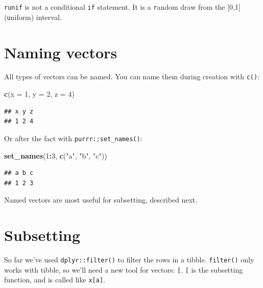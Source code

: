\documentclass[
]{book}
\newenvironment{Shaded}{\begin{snugshade}}{\end{snugshade}}
\newcommand{\DataTypeTok}[1]{\textcolor[rgb]{0.13,0.29,0.53}{#1}}
\newcommand{\DecValTok}[1]{\textcolor[rgb]{0.00,0.00,0.81}{#1}}
\newcommand{\KeywordTok}[1]{\textcolor[rgb]{0.13,0.29,0.53}{\textbf{#1}}}
\newcommand{\NormalTok}[1]{#1}
\newcommand{\OperatorTok}[1]{\textcolor[rgb]{0.81,0.36,0.00}{\textbf{#1}}}
\newcommand{\StringTok}[1]{\textcolor[rgb]{0.31,0.60,0.02}{#1}}
\begin{document}
\texttt{runif} is not a conditional \texttt{if} statement. It is a \texttt{r}andom draw from the {[}0,1{]} (\texttt{u}niform) interval.

\hypertarget{naming-vectors}{%
\section{Naming vectors}\label{naming-vectors}}

All types of vectors can be named.
You can name them during creation with \texttt{c()}:

\begin{Shaded}
\begin{Highlighting}[]
\KeywordTok{c}\NormalTok{(}\DataTypeTok{x =} \DecValTok{1}\NormalTok{, }\DataTypeTok{y =} \DecValTok{2}\NormalTok{, }\DataTypeTok{z =} \DecValTok{4}\NormalTok{)}
\end{Highlighting}
\end{Shaded}

\begin{verbatim}
## x y z 
## 1 2 4
\end{verbatim}

Or after the fact with \texttt{purrr::set\_names()}:

\begin{Shaded}
\begin{Highlighting}[]
\KeywordTok{set_names}\NormalTok{(}\DecValTok{1}\OperatorTok{:}\DecValTok{3}\NormalTok{, }\KeywordTok{c}\NormalTok{(}\StringTok{"a"}\NormalTok{, }\StringTok{"b"}\NormalTok{, }\StringTok{"c"}\NormalTok{))}
\end{Highlighting}
\end{Shaded}

\begin{verbatim}
## a b c 
## 1 2 3
\end{verbatim}

Named vectors are most useful for subsetting, described next.

\hypertarget{vector-subsetting}{%
\section{Subsetting}\label{vector-subsetting}}

So far we've used \texttt{dplyr::filter()} to filter the rows in a tibble.
\texttt{filter()} only works with tibble, so we'll need a new tool for vectors: \texttt{{[}}.
\texttt{{[}} is the subsetting function, and is called like \texttt{x{[}a{]}}.
\end{document}
